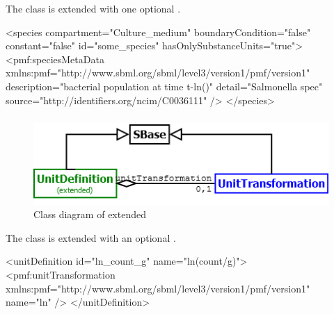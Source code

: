 The \Species class is extended with one optional \SpeciesMetaData.
\begin{example}[showstringspaces=false]
<species compartment="Culture_medium" boundaryCondition="false" constant="false"
  id="some_species" hasOnlySubstanceUnits="true">
  <pmf:speciesMetaData xmlns:pmf="http://www.sbml.org/sbml/level3/version1/pmf/version1"
    description="bacterial population at time t-ln()" detail="Salmonella spec"
    source="http://identifiers.org/ncim/C0036111" />
</species>
\end{example}

\subsubsection{}
\begin{figure}[h]
	\includegraphics[scale=0.8]{img/UnitDefinition}
	\caption{Class diagram of extended \UnitDefinition}
	\label{UnitDefinition}
\end{figure}

The \UnitTransformation class is extended with an optional \UnitTransformation.

\begin{example}
<unitDefinition id="ln_count_g" name="ln(count/g)">
  <pmf:unitTransformation xmlns:pmf="http://www.sbml.org/sbml/level3/version1/pmf/version1"
    name="ln" />
</unitDefinition>
\end{example}
